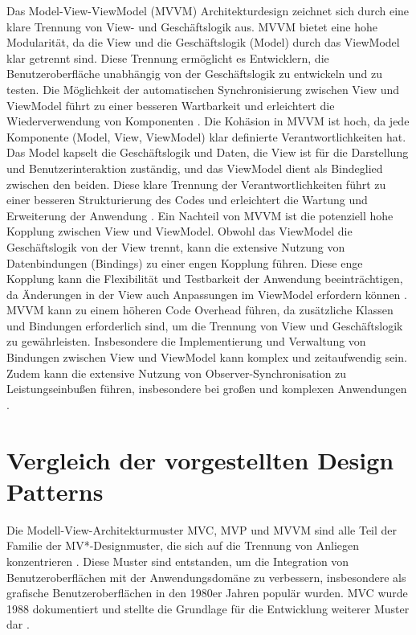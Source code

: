 Das Model-View-ViewModel (MVVM) Architekturdesign zeichnet sich durch eine klare 
Trennung von View- und Geschäftslogik aus.
MVVM bietet eine hohe Modularität, da die View und die Geschäftslogik (Model) 
durch das ViewModel klar getrennt sind. Diese Trennung ermöglicht es Entwicklern, 
die Benutzeroberfläche unabhängig von der Geschäftslogik zu entwickeln und zu 
testen. Die Möglichkeit der automatischen Synchronisierung zwischen View und 
ViewModel führt zu einer besseren Wartbarkeit und erleichtert die Wiederverwendung 
von Komponenten \cite{arcos2018comparative}.
Die Kohäsion in MVVM ist hoch, da jede Komponente (Model, View, ViewModel) klar 
definierte Verantwortlichkeiten hat. Das Model kapselt die Geschäftslogik und 
Daten, die View ist für die Darstellung und Benutzerinteraktion zuständig, und das 
ViewModel dient als Bindeglied zwischen den beiden. Diese klare Trennung der 
Verantwortlichkeiten führt zu einer besseren Strukturierung des Codes und erleichtert 
die Wartung und Erweiterung der Anwendung \cite{arcos2018comparative}.
Ein Nachteil von MVVM ist die potenziell hohe Kopplung zwischen View und 
ViewModel. Obwohl das ViewModel die Geschäftslogik von der View trennt, kann die 
extensive Nutzung von Datenbindungen (Bindings) zu einer engen Kopplung führen. 
Diese enge Kopplung kann die Flexibilität und Testbarkeit der Anwendung 
beeinträchtigen, da Änderungen in der View auch Anpassungen im ViewModel 
erfordern können \cite{arcos2018comparative}.
MVVM kann zu einem höheren Code Overhead führen, da zusätzliche Klassen und 
Bindungen erforderlich sind, um die Trennung von View und Geschäftslogik zu 
gewährleisten. Insbesondere die Implementierung und Verwaltung von Bindungen 
zwischen View und ViewModel kann komplex und zeitaufwendig sein. Zudem kann die 
extensive Nutzung von Observer-Synchronisation zu Leistungseinbußen führen, 
insbesondere bei großen und komplexen Anwendungen \cite{arcos2018comparative}.

\section{Vergleich der vorgestellten Design Patterns}
Die Modell-View-Architekturmuster MVC, MVP und MVVM sind alle Teil der Familie der 
MV*-Designmuster, die sich auf die Trennung von Anliegen konzentrieren \cite{aihara2012mvc}. Diese 
Muster sind entstanden, um die Integration von Benutzeroberflächen mit der Anwendungsdomäne zu 
verbessern, insbesondere als grafische Benutzeroberflächen in den 1980er Jahren populär wurden. 
MVC wurde 1988 dokumentiert und stellte die Grundlage für die Entwicklung weiterer Muster dar 
\cite{aihara2012mvc}.

